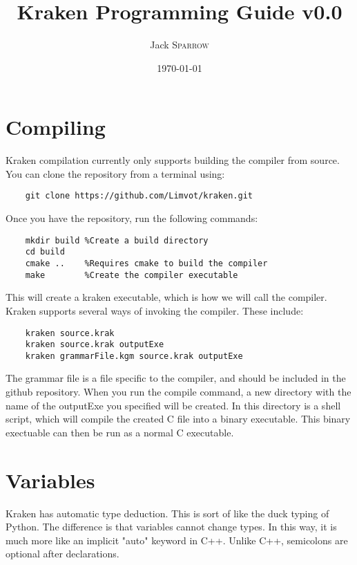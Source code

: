 \documentclass{article}
\title{Kraken Programming Guide v0.0} %
\author{Jack \textsc{Sparrow}} %
\date{\today} %
\begin{document}
\maketitle %

\section{Compiling}
  Kraken compilation currently only supports building the compiler from source.
You can clone the repository from a terminal using:
  \begin{lstlisting}
    git clone https://github.com/Limvot/kraken.git
  \end{lstlisting}
Once you have the repository, run the following commands:
  \begin{lstlisting}
    mkdir build %Create a build directory
    cd build
    cmake ..    %Requires cmake to build the compiler
    make        %Create the compiler executable
  \end{lstlisting}
This will create a kraken executable, which is how we will call the compiler.
Kraken supports several ways of invoking the compiler.  These include:
  \begin{lstlisting}
    kraken source.krak
    kraken source.krak outputExe
    kraken grammarFile.kgm source.krak outputExe
  \end{lstlisting}
The grammar file is a file specific to the compiler, and should be included
in the github repository.  When you run the compile command, a new directory
with the name of the outputExe you specified will be created.  In this directory
is a shell script, which will compile the created C file into a binary executable.
This binary exectuable can then be run as a normal C executable.


\section{Variables}
\label{sec:var}
  Kraken has automatic type deduction.  This is sort of like the duck typing of
Python.  The difference is that variables cannot change types.  In this way, it
is much more like an implicit "auto" keyword in C++.  Unlike C++, semicolons are
optional after declarations.
\end{document}
